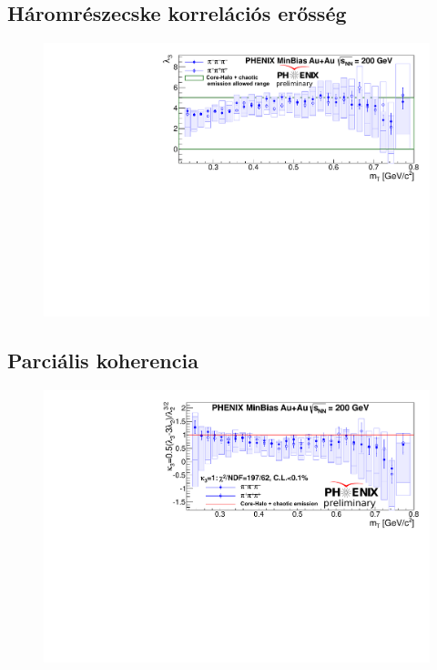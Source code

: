 \documentclass[10pt,a4paper]{article}
\numberwithin{equation}{subsection}
\numberwithin{figure}{section}
\begin{document}
\subsection{Háromrészecske korrelációs erősség}
\begin{figure}[H]
\centering
\includegraphics[scale=0.75]{pic/res/lambda3.pdf}
\end{figure}
\subsection{Parciális koherencia}
\begin{figure}[H]
\centering
\includegraphics[scale=0.75]{pic/res/kappa3.pdf}
\end{figure}
\end{document}
